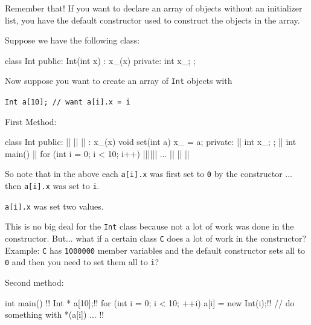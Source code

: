 Remember that! If you want to declare an array of objects without an
initializer list, you  have the default constructor used to
construct the objects in the array.

Suppose we have the following class:

\begin{console}
class Int
{
public:
        Int(int x)
        : x_(x)
        {}
private:
        int x_;
};
\end{console}
Now suppose you want to create an array of \texttt{Int} objects with
\begin{center}
\texttt{Int a[10]; // want a[i].x = i}
\end{center}
First Method:
\begin{consolethree}[escapeinside=||]
class Int
{                      
public:
    || || ||  
        : x_(x) {}
    void set(int a)    
    {
        x_ = a;        
    }                  
private:                 ||  
    int x_;
};
||
int main()
{               
    ||
    for (int i = 0; i < 10; i++)
        ||||||
    ... || || ||
}
\end{consolethree}
\newpage So note that in the above each \texttt{a[i].x} was first set to \texttt{0} by the constructor ... then \texttt{a[i].x} was set to \texttt{i}.

 \texttt{a[i].x} was set two values.

This is no big deal for the \texttt{Int} class because not a lot of work
was done in the constructor. But... what if a certain class \texttt{C}
does a lot of work in the constructor? Example: \texttt{C} has
\texttt{1000000} member variables and the default constructor sets all to
\texttt{0} and then you need to set them all to \texttt{i}?

Second method:
\begin{consolethree}[escapeinside=!!]
int main()
{   !!
    Int * a[10];!! 
    for (int i = 0; i < 10; ++i)
        a[i] = new Int(i);!!
    // do something with *(a[i])
    ... !!
}
\end{consolethree}

